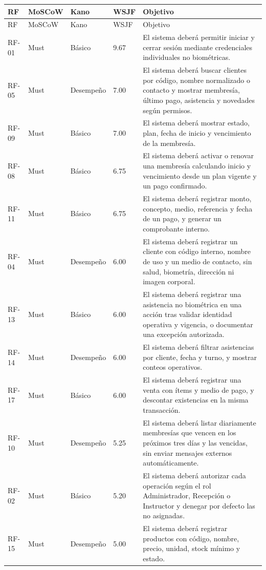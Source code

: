 \documentclass[11pt,a4paper,twoside]{article}
\begin{document}
\small
\setlength{\tabcolsep}{4pt}
\begin{longtable}{p{1.8cm}p{1.45cm}p{1.65cm}p{1.0cm}p{7.7cm}}
\toprule RF & MoSCoW & Kano & WSJF & Objetivo \\ \midrule
\endfirsthead
\toprule RF & MoSCoW & Kano & WSJF & Objetivo \\ \midrule
\endhead
RF-01 & Must & Básico & 9.67 & El sistema deberá permitir iniciar y cerrar sesión mediante credenciales individuales no biométricas. \\
RF-05 & Must & Desempeño & 7.00 & El sistema deberá buscar clientes por código, nombre normalizado o contacto y mostrar membresía, último pago, asistencia y novedades según permisos. \\
RF-09 & Must & Básico & 7.00 & El sistema deberá mostrar estado, plan, fecha de inicio y vencimiento de la membresía. \\
RF-08 & Must & Básico & 6.75 & El sistema deberá activar o renovar una membresía calculando inicio y vencimiento desde un plan vigente y un pago confirmado. \\
RF-11 & Must & Básico & 6.75 & El sistema deberá registrar monto, concepto, medio, referencia y fecha de un pago, y generar un comprobante interno. \\
RF-04 & Must & Desempeño & 6.00 & El sistema deberá registrar un cliente con código interno, nombre de uso y un medio de contacto, sin salud, biometría, dirección ni imagen corporal. \\
RF-13 & Must & Básico & 6.00 & El sistema deberá registrar una asistencia no biométrica en una acción tras validar identidad operativa y vigencia, o documentar una excepción autorizada. \\
RF-14 & Must & Desempeño & 6.00 & El sistema deberá filtrar asistencias por cliente, fecha y turno, y mostrar conteos operativos. \\
RF-17 & Must & Básico & 6.00 & El sistema deberá registrar una venta con ítems y medio de pago, y descontar existencias en la misma transacción. \\
RF-10 & Must & Desempeño & 5.25 & El sistema deberá listar diariamente membresías que vencen en los próximos tres días y las vencidas, sin enviar mensajes externos automáticamente. \\
RF-02 & Must & Básico & 5.20 & El sistema deberá autorizar cada operación según el rol Administrador, Recepción o Instructor y denegar por defecto las no asignadas. \\
RF-15 & Must & Desempeño & 5.00 & El sistema deberá registrar productos con código, nombre, precio, unidad, stock mínimo y estado. \\

\end{longtable}
\end{document}
